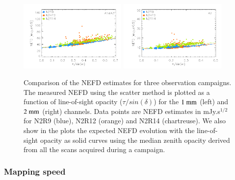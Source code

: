 \begin{figure}[!thbp]
\begin{center}
\includegraphics[clip=true,width=0.47\textwidth]{Figures/plot_nefd_vs_obstau_corrected_skydip_vfinal_1mm.pdf}
\includegraphics[clip=true,width=0.47\textwidth]{Figures/plot_nefd_vs_obstau_corrected_skydip_vfinal_a2.pdf}
\caption{Comparison of the NEFD estimates for three observation
  campaigns. The measured NEFD using the scatter method is plotted as a function of
  line-of-sight opacity ($\tau/sin(\delta)$) for the $1~\rm{mm}$ (left) and $2~\rm{mm}$ (right)
  channels. Data points are NEFD estimates in mJy.s$^{1/2}$ for N2R9 (blue), N2R12 (orange)
  and N2R14 (chartreuse). We also show in the plots the expected NEFD evolution
  with the line-of-sight opacity as solid curves using the median
  zenith opacity derived from all the scans acquired during a campaign.}
\label{fig:nefdvsbackground_below_1Jy}
\end{center}
\end{figure}


\subsubsection{Mapping speed}


